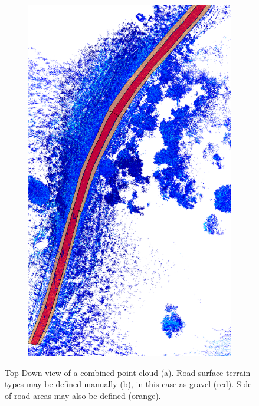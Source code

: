 \documentclass[numbered,pdftex]{ohio-etd}
\begin{document}
{{{{\begin{figure}[H]
\begin{subfigure}{0.45\textwidth}
						\includegraphics[width=1.0\linewidth]{Defense_Images/Post-Manual_Classify_1}
						\caption[Bean Hollow Road Camera View]{}
						\label{fig:Post-Manual_Classify_1}
					\end{subfigure}
					\caption[Manual Point Cloud Classification Overview]{Top-Down view of a combined point cloud (a). Road surface terrain types may be defined manually (b), in this case as gravel (red). Side-of-road areas may also be defined (orange). }
					\label{fig:Manual_Classification_Overview}
				\end{figure}
				
}}}}
\end{document}
